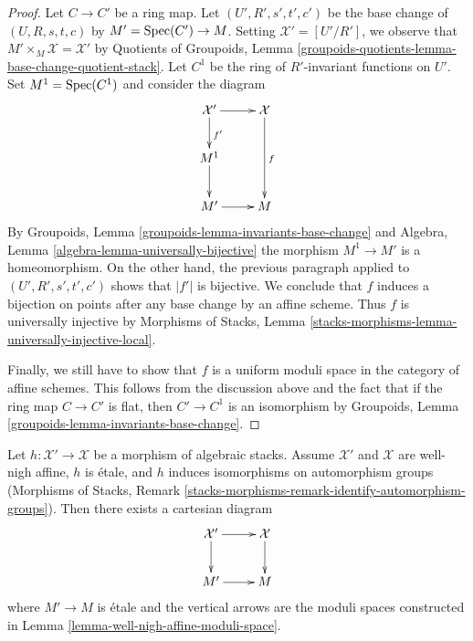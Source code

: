 \begin{proof}
\medskip\noindent
Let $C \to C'$ be a ring map. Let $(U', R', s', t', c')$ be
the base change of $(U, R, s, t, c)$ by $M' = \mathop{\mathrm{Spec}}(C') \to M$.
Setting $\mathcal{X}' = [U'/R']$, we observe that
$M' \times_M \mathcal{X} = \mathcal{X}'$ by
Quotients of Groupoids, Lemma
\ref{groupoids-quotients-lemma-base-change-quotient-stack}.
Let $C^1$ be the ring of $R'$-invariant functions on $U'$.
Set $M^1 = \mathop{\mathrm{Spec}}(C^1)$ and consider the diagram
$$
\xymatrix{
\mathcal{X}' \ar[d]^{f'} \ar[r] & \mathcal{X} \ar[dd]^f \\
M^1 \ar[d] \\
M' \ar[r] & M
}
$$
By Groupoids, Lemma \ref{groupoids-lemma-invariants-base-change} and
Algebra, Lemma \ref{algebra-lemma-universally-bijective}
the morphism $M^1 \to M'$ is a homeomorphism.
On the other hand, the previous paragraph applied to
$(U', R', s', t', c')$ shows that $|f'|$ is bijective.
We conclude that $f$ induces a bijection on points after any
base change by an affine scheme. Thus $f$ is universally injective
by Morphisms of Stacks, Lemma
\ref{stacks-morphisms-lemma-universally-injective-local}.

\medskip\noindent
Finally, we still have to show that $f$ is a uniform moduli space
in the category of affine schemes. This follows from the discussion
above and the fact that if the
ring map $C \to C'$ is flat, then $C' \to C^1$ is an isomorphism
by Groupoids, Lemma \ref{groupoids-lemma-invariants-base-change}.
\end{proof}

\begin{lemma}
\label{lemma-well-nigh-affine-moduli-space-etale}
Let $h : \mathcal{X}' \to \mathcal{X}$ be a morphism of algebraic stacks.
Assume $\mathcal{X}'$ and $\mathcal{X}$ are well-nigh affine,
$h$ is \'etale, and $h$ induces isomorphisms on automorphism groups
(Morphisms of Stacks, Remark
\ref{stacks-morphisms-remark-identify-automorphism-groups}).
Then there exists a cartesian diagram
$$
\xymatrix{
\mathcal{X}' \ar[d] \ar[r] & \mathcal{X} \ar[d] \\
M' \ar[r] & M
}
$$
where $M' \to M$ is \'etale and
the vertical arrows are the moduli spaces constructed in
Lemma \ref{lemma-well-nigh-affine-moduli-space}.
\end{lemma}


